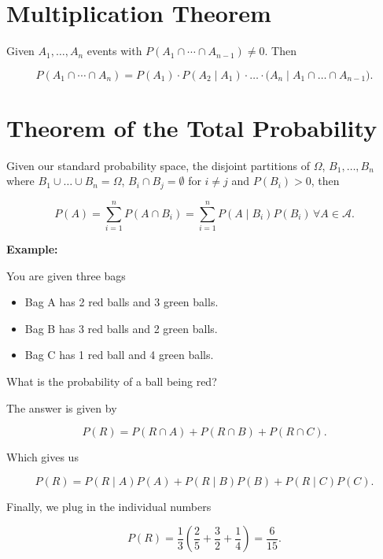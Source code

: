 \QED

\section{Multiplication Theorem}

Given \(A_1, \dots, A_n\) events with \(P(A_1 \cap \cdots \cap A_{n - 1}) \ne 0\). Then 

\[
    P(A_1 \cap \cdots \cap A_n) = P(A_1)\cdot P(A_2 \mid A_1) \cdot \dots \cdot \mathbb(A_n \mid A_1 \cap \dots \cap A_{n - 1}).
\]

\section{Theorem of the Total Probability}

Given our standard probability space, the disjoint partitions of \(\Omega\), \(B_1, \dots, B_n\) where 
\(B_1 \cup \dots \cup B_n = \Omega\), \(B_i \cap B_j = \emptyset\) for \(i \neq j\) and \(P(B_i) > 0\), then

\[
    P (A) = \sum_{i = 1}^{n} P(A \cap B_i) = \sum_{i = 1}^{n}P (A \mid B_i )P(B_i) \, \forall A \in \mathcal{A}.
\]

\textbf{Example:}

You are given three bags 

\begin{itemize}
	
    \item Bag A has 2 red balls and 3 green balls.

    \item Bag B has 3 red balls and 2 green balls.

    \item Bag C has 1 red ball and 4 green balls.

\end{itemize}

What is the probability of a ball being red? 

The answer is given by

\[
    P(R) = P (R \cap A) + P (R \cap B) + P (R \cap C).
\]

Which gives us 

\[
    P(R) = P (R \mid A)P (A) + P (R \mid B) P(B) + P (R \mid C) P(C).
\]

Finally, we plug in the individual numbers 

\[
    P(R) = \frac{1}{3} \left(\frac{2}{5} + \frac{3}{2} + \frac{1}{4} \right) = \frac{6}{15}.
\]

